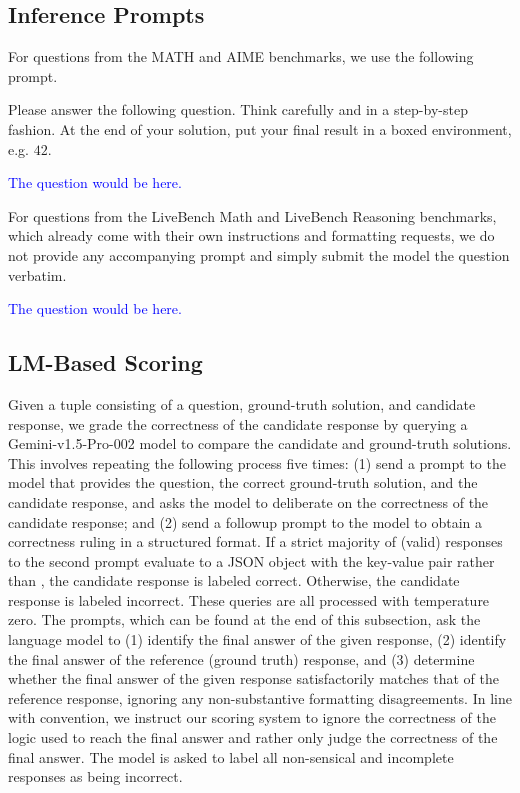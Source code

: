 \subsection{Inference Prompts}
For questions from the MATH and AIME benchmarks, we use the following prompt.
\begin{tcolorbox}[title=MATH and AIME Prompt]
Please answer the following question. Think carefully and in a step-by-step fashion. At the end of your solution, put your final result in a boxed environment, e.g. $\boxed{42}$.

\textcolor{blue}{The question would be here.}
\end{tcolorbox}

For questions from the LiveBench Math and LiveBench Reasoning benchmarks, which already come with their own instructions and formatting requests, we do not provide any accompanying prompt and simply submit the model the question verbatim.
\begin{tcolorbox}[title=LiveBench Prompt]
\textcolor{blue}{The question would be here.}
\end{tcolorbox}

\subsection{LM-Based Scoring}
\label{app:scoring}

Given a tuple consisting of a question, ground-truth solution, and candidate response, we grade the correctness of the candidate response by querying a Gemini-v1.5-Pro-002 model to compare the candidate and ground-truth solutions.
This involves repeating the following process five times: (1) send a prompt to the model that provides the question, the correct ground-truth solution, and the candidate response, and asks the model to deliberate on the correctness of the candidate response; and (2) send a followup prompt to the model to obtain a correctness ruling in a structured format.
If a strict majority of (valid) responses to the second prompt evaluate to a JSON object with the key-value pair  rather than , the candidate response is labeled correct. Otherwise, the candidate response is labeled incorrect.
These queries are all processed with temperature zero.
The prompts, which can be found at the end of this subsection,
 ask the language model to
(1) identify the final answer of the given response, (2) identify the final answer of the reference (ground truth) response, and (3) determine whether the final answer of the given response satisfactorily matches that of the reference response, ignoring
any non-substantive formatting disagreements.
In line with convention, we instruct our scoring system to ignore the correctness of the logic used to reach the final answer and rather only judge the correctness of the final answer.
The model is asked to label all non-sensical and incomplete responses as being incorrect.

